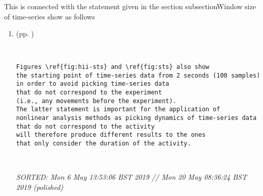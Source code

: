 \documentclass[12pt]{article}
\begin{document}
This is connected with the statement given in the
section subsection{Window size of time-series} show as follows



\begin{enumerate}


\item  (pp. )  

	
%


	\begin{verbatim}


Figures \ref{fig:hii-sts} and \ref{fig:sts} also show 
the starting point of time-series data from 2 seconds (100 samples) 
in order to avoid picking time-series data 
that do not correspond to the experiment 
(i.e., any movements before the experiment).
The latter statement is important for the application of
nonlinear analysis methods as picking dynamics of time-series data 
that do not correspond to the activity
will therefore produce different results to the ones 
that only consider the duration of the activity. 



	\end{verbatim}
	\textit{
	SORTED:  Mon  6 May 13:53:06 BST 2019 //
	Mon 20 May 08:36:24 BST 2019 (polished)
	}
	\\


\end{enumerate}
\end{document}
